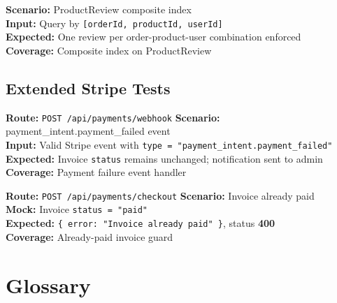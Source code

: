 ﻿\documentclass[12pt,a4paper]{report}
\newcommand{\pone}{\textbf{\color{p1red}P1}}
\newcommand{\ptwo}{\textbf{\color{p2orange}P2}}
\begin{document}
\begin{tcolorbox}[testbox,title={DB-009 \hfill \ptwo}]
\textbf{Scenario:} ProductReview composite index \\
\textbf{Input:} Query by \texttt{[orderId, productId, userId]} \\
\textbf{Expected:} One review per order-product-user combination enforced \\
\textbf{Coverage:} Composite index on ProductReview
\end{tcolorbox}

\section{Extended Stripe Tests}

\begin{tcolorbox}[testbox,title={STRIPE-006 \hfill \pone}]
\textbf{Route:} \texttt{POST /api/payments/webhook} \quad \textbf{Scenario:} payment\_intent.payment\_failed event \\
\textbf{Input:} Valid Stripe event with \texttt{type = "payment\_intent.payment\_failed"} \\
\textbf{Expected:} Invoice \texttt{status} remains unchanged; notification sent to admin \\
\textbf{Coverage:} Payment failure event handler
\end{tcolorbox}

\begin{tcolorbox}[testbox,title={STRIPE-007 \hfill \ptwo}]
\textbf{Route:} \texttt{POST /api/payments/checkout} \quad \textbf{Scenario:} Invoice already paid \\
\textbf{Mock:} Invoice \texttt{status = "paid"} \\
\textbf{Expected:} \texttt{\{ error: "Invoice already paid" \}}, status \textbf{400} \\
\textbf{Coverage:} Already-paid invoice guard
\end{tcolorbox}

\chapter{Glossary}
\end{document}
